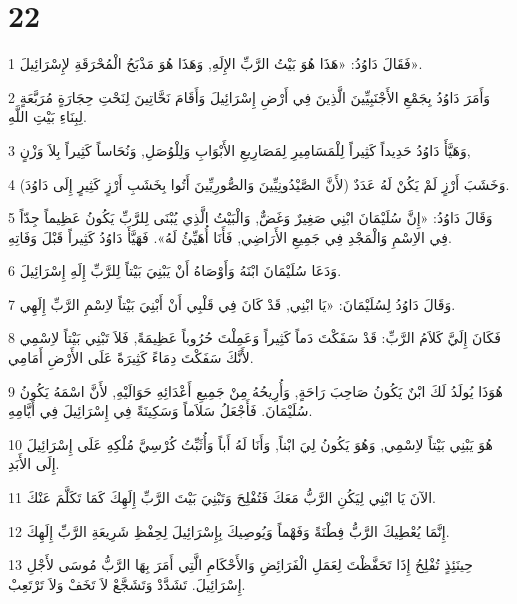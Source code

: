 \chapter{22}

\par 1 فَقَالَ دَاوُدُ: «هَذَا هُوَ بَيْتُ الرَّبِّ الإِلَهِ, وَهَذَا هُوَ مَذْبَحُ الْمُحْرَقَةِ لإِسْرَائِيلَ».
\par 2 وَأَمَرَ دَاوُدُ بِجَمْعِ الأَجْنَبِيِّينَ الَّذِينَ فِي أَرْضِ إِسْرَائِيلَ وَأَقَامَ نَحَّاتِينَ لِنَحْتِ حِجَارَةٍ مُرَبَّعَةٍ لِبِنَاءِ بَيْتِ اللَّهِ.
\par 3 وَهَيَّأَ دَاوُدُ حَدِيداً كَثِيراً لِلْمَسَامِيرِ لِمَصَارِيعِ الأَبْوَابِ وَلِلْوُصَلِ, وَنُحَاساً كَثِيراً بِلاَ وَزْنٍ,
\par 4 وَخَشَبَ أَرْزٍ لَمْ يَكُنْ لَهُ عَدَدٌ (لأَنَّ الصَّيْدُونِيِّينَ وَالصُّورِيِّينَ أَتُوا بِخَشَبِ أَرْزٍ كَثِيرٍ إِلَى دَاوُدَ).
\par 5 وَقَالَ دَاوُدُ: «إِنَّ سُلَيْمَانَ ابْنِي صَغِيرٌ وَغَضٌّ, وَالْبَيْتُ الَّذِي يُبْنَى لِلرَّبِّ يَكُونُ عَظِيماً جِدّاً فِي الاِسْمِ وَالْمَجْدِ فِي جَمِيعِ الأَرَاضِي, فَأَنَا أُهَيِّئُ لَهُ». فَهَيَّأَ دَاوُدُ كَثِيراً قَبْلَ وَفَاتِهِ.
\par 6 وَدَعَا سُلَيْمَانَ ابْنَهُ وَأَوْصَاهُ أَنْ يَبْنِيَ بَيْتاً لِلرَّبِّ إِلَهِ إِسْرَائِيلَ.
\par 7 وَقَالَ دَاوُدُ لِسُلَيْمَانَ: «يَا ابْنِي, قَدْ كَانَ فِي قَلْبِي أَنْ أَبْنِيَ بَيْتاً لاِسْمِ الرَّبِّ إِلَهِي.
\par 8 فَكَانَ إِلَيَّ كَلاَمُ الرَّبِّ: قَدْ سَفَكْتَ دَماً كَثِيراً وَعَمِلْتَ حُرُوباً عَظِيمَةً, فَلاَ تَبْنِي بَيْتاً لاِسْمِي لأَنَّكَ سَفَكْتَ دِمَاءً كَثِيرَةً عَلَى الأَرْضِ أَمَامِي.
\par 9 هُوَذَا يُولَدُ لَكَ ابْنٌ يَكُونُ صَاحِبَ رَاحَةٍ, وَأُرِيحُهُ مِنْ جَمِيعِ أَعْدَائِهِ حَوَالَيْهِ, لأَنَّ اسْمَهُ يَكُونُ سُلَيْمَانَ. فَأَجْعَلُ سَلاَماً وَسَكِينَةً فِي إِسْرَائِيلَ فِي أَيَّامِهِ.
\par 10 هُوَ يَبْنِي بَيْتاً لاِسْمِي, وَهُوَ يَكُونُ لِيَ ابْناً, وَأَنَا لَهُ أَباً وَأُثَبِّتُ كُرْسِيَّ مُلْكِهِ عَلَى إِسْرَائِيلَ إِلَى الأَبَدِ.
\par 11 الآنَ يَا ابْنِي لِيَكُنِ الرَّبُّ مَعَكَ فَتُفْلِحَ وَتَبْنِيَ بَيْتَ الرَّبِّ إِلَهِكَ كَمَا تَكَلَّمَ عَنْكَ.
\par 12 إِنَّمَا يُعْطِيكَ الرَّبُّ فِطْنَةً وَفَهْماً وَيُوصِيكَ بِإِسْرَائِيلَ لِحِفْظِ شَرِيعَةِ الرَّبِّ إِلَهِكَ.
\par 13 حِينَئِذٍ تُفْلِحُ إِذَا تَحَفَّظْتَ لِعَمَلِ الْفَرَائِضِ وَالأَحْكَامِ الَّتِي أَمَرَ بِهَا الرَّبُّ مُوسَى لأَجْلِ إِسْرَائِيلَ. تَشَدَّدْ وَتَشَجَّعْ لاَ تَخَفْ وَلاَ تَرْتَعِبْ.
